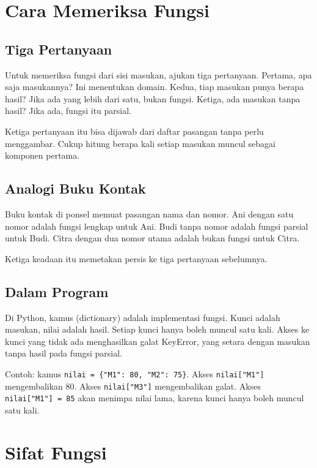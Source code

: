 \documentclass[11pt,a4paper]{article}
\begin{document}
\section{Cara Memeriksa Fungsi}

\subsection{Tiga Pertanyaan}

Untuk memeriksa fungsi dari sisi masukan, ajukan tiga pertanyaan. Pertama, apa saja masukannya? Ini menentukan domain. Kedua, tiap masukan punya berapa hasil? Jika ada yang lebih dari satu, bukan fungsi. Ketiga, ada masukan tanpa hasil? Jika ada, fungsi itu parsial.

Ketiga pertanyaan itu bisa dijawab dari daftar pasangan tanpa perlu menggambar. Cukup hitung berapa kali setiap masukan muncul sebagai komponen pertama.

\subsection{Analogi Buku Kontak}

Buku kontak di ponsel memuat pasangan nama dan nomor. Ani dengan satu nomor adalah fungsi lengkap untuk Ani. Budi tanpa nomor adalah fungsi parsial untuk Budi. Citra dengan dua nomor utama adalah bukan fungsi untuk Citra.

Ketiga keadaan itu memetakan persis ke tiga pertanyaan sebelumnya.

\subsection{Dalam Program}

Di Python, kamus (dictionary) adalah implementasi fungsi. Kunci adalah masukan, nilai adalah hasil. Setiap kunci hanya boleh muncul satu kali. Akses ke kunci yang tidak ada menghasilkan galat KeyError, yang setara dengan masukan tanpa hasil pada fungsi parsial.

Contoh: kamus \texttt{nilai~=~\{"M1":~80,~"M2":~75\}}. Akses \texttt{nilai["M1"]} mengembalikan 80. Akses \texttt{nilai["M3"]} mengembalikan galat. Akses \texttt{nilai["M1"]~=~85} akan menimpa nilai lama, karena kunci hanya boleh muncul satu kali.

\section{Sifat Fungsi}
\end{document}
